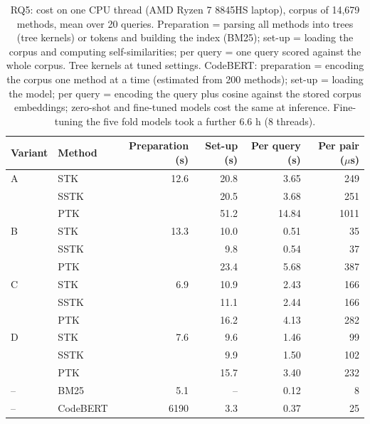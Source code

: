 \begin{table}[t]
\centering
\caption{RQ5: cost on one CPU thread (AMD Ryzen 7 8845HS laptop), corpus of 14,679 methods, mean over 20 queries. Preparation = parsing all methods into trees (tree kernels) or tokens and building the index (BM25); set-up = loading the corpus and computing self-similarities; per query = one query scored against the whole corpus. Tree kernels at tuned settings. CodeBERT: preparation = encoding the corpus one method at a time (estimated from 200 methods); set-up = loading the model; per query = encoding the query plus cosine against the stored corpus embeddings; zero-shot and fine-tuned models cost the same at inference. Fine-tuning the five fold models took a further 6.6 h (8 threads).}
\label{tab:rq5}
\small
\begin{tabular}{llrrrr}
\toprule
Variant & Method & Preparation (s) & Set-up (s) & Per query (s) & Per pair ($\mu$s) \\
\midrule
A & STK & 12.6 & 20.8 & 3.65 & 249 \\
 & SSTK &  & 20.5 & 3.68 & 251 \\
 & PTK &  & 51.2 & 14.84 & 1011 \\
\midrule
B & STK & 13.3 & 10.0 & 0.51 & 35 \\
 & SSTK &  & 9.8 & 0.54 & 37 \\
 & PTK &  & 23.4 & 5.68 & 387 \\
\midrule
C & STK & 6.9 & 10.9 & 2.43 & 166 \\
 & SSTK &  & 11.1 & 2.44 & 166 \\
 & PTK &  & 16.2 & 4.13 & 282 \\
\midrule
D & STK & 7.6 & 9.6 & 1.46 & 99 \\
 & SSTK &  & 9.9 & 1.50 & 102 \\
 & PTK &  & 15.7 & 3.40 & 232 \\
\midrule
-- & BM25 & 5.1 & -- & 0.12 & 8 \\
-- & CodeBERT & 6190 & 3.3 & 0.37 & 25 \\
\bottomrule
\end{tabular}
\end{table}
